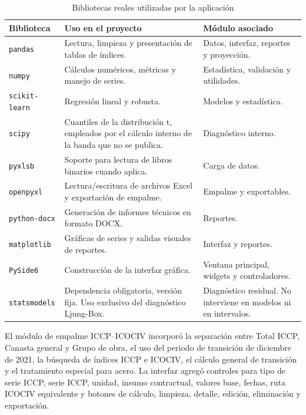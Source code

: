 \documentclass[12pt,letterpaper]{article}
\newcommand{\ICOCIV}{ICOCIV}
\newcommand{\ICCP}{ICCP}
\begin{document}
\begin{table}[H]
\centering
\caption{Bibliotecas reales utilizadas por la aplicación}
\label{tab:bibliotecas_reales}
\vspace{\baselineskip}
\scriptsize
\begin{adjustbox}{max width=\textwidth}
\begin{tabularx}{\textwidth}{@{}p{3.2cm}YY@{}}
\toprule
\textbf{Biblioteca} & \textbf{Uso en el proyecto} & \textbf{Módulo asociado} \\
\midrule
\texttt{pandas} & Lectura, limpieza y presentación de tablas de índices. & Datos, interfaz, reportes y proyección. \\
\texttt{numpy} & Cálculos numéricos, métricas y manejo de series. & Estadística, validación y utilidades. \\
\texttt{scikit-learn} & Regresión lineal y robusta. & Modelos y estadística. \\
\texttt{scipy} & Cuantiles de la distribución t, empleados por el cálculo interno de la banda que no se publica. & Diagnóstico interno. \\
\texttt{pyxlsb} & Soporte para lectura de libros binarios cuando aplica. & Carga de datos. \\
\texttt{openpyxl} & Lectura/escritura de archivos Excel y exportación de empalme. & Empalme y exportables. \\
\texttt{python-docx} & Generación de informes técnicos en formato DOCX. & Reportes. \\
\texttt{matplotlib} & Gráficas de series y salidas visuales de reportes. & Interfaz y reportes. \\
\texttt{PySide6} & Construcción de la interfaz gráfica. & Ventana principal, widgets y controladores. \\
\texttt{statsmodels} & Dependencia obligatoria, versión fija. Uso exclusivo del diagnóstico Ljung-Box. & Diagnóstico residual. No interviene en modelos ni en intervalos. \\
\bottomrule
\end{tabularx}
\end{adjustbox}
\end{table}

El módulo de empalme \ICCP--\ICOCIV{} incorporó la separación entre Total \ICCP, Canasta general y Grupo de obra, el uso del periodo de transición de diciembre de 2021, la búsqueda de índices \ICCP{} e \ICOCIV, el cálculo general de transición y el tratamiento especial para acero. La interfaz agregó controles para tipo de serie \ICCP, serie \ICCP, unidad, insumo contractual, valores base, fechas, ruta \ICOCIV{} equivalente y botones de cálculo, limpieza, detalle, edición, eliminación y exportación.
\end{document}
